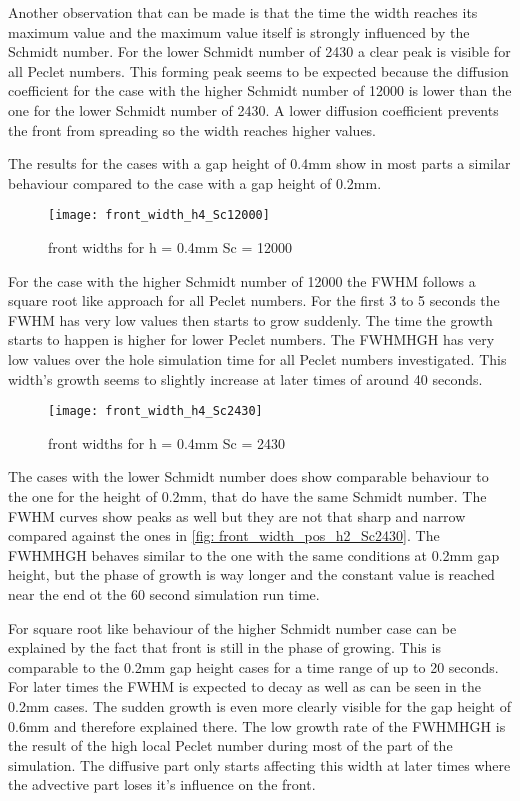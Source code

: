 \documentclass[../thesis.tex]{subfiles}
\begin{document}
Another observation that can be made is that the time the width reaches its maximum value and the maximum value itself is strongly influenced by the Schmidt number. For the lower Schmidt number of 2430 a clear peak is visible for all Peclet numbers. This forming peak seems to be expected because the diffusion coefficient for the case with the higher Schmidt number of 12000 is lower than the one for the lower Schmidt number of 2430. A lower diffusion coefficient prevents the front from spreading so the width reaches higher values.
\newline

The results for the cases with a gap height of 0.4mm show in most parts a similar behaviour compared to the case with a gap height of 0.2mm.
\begin{figure}[htb]
	\centering
	\texttt{[image: front\_width\_h4\_Sc12000]}
	\caption{front widths for  h = 0.4mm Sc = 12000
	\label{fig: front_width_h4_Sc12000}}
\end{figure}
For the case with the higher Schmidt number of 12000 the FWHM follows a square root like approach for all Peclet numbers. For the first 3 to 5 seconds the FWHM has very low values then starts to grow suddenly. The time the growth starts to happen is higher for lower Peclet numbers. The FWHMHGH has very low values over the hole simulation time for all Peclet numbers investigated. This width's growth seems to slightly increase at later times of around 40 seconds.
\begin{figure}[htb]
	\centering
	\texttt{[image: front\_width\_h4\_Sc2430]}
	\caption{front widths for  h = 0.4mm Sc = 2430
		\label{fig: front_width_pos_h4_Sc2430}}
\end{figure}

The cases with the lower Schmidt number does show comparable behaviour to the one for the height of 0.2mm, that do have the same Schmidt number. The FWHM curves show peaks as well but they are not that sharp and narrow compared against the ones in \autoref{fig: front_width_pos_h2_Sc2430}. The FWHMHGH behaves similar to the one with the same conditions at 0.2mm gap height, but the phase of growth is way longer and the constant value is reached near the end ot the 60 second simulation run time.

For square root like behaviour of the higher Schmidt number case can be explained by the fact that front is still in the phase of growing. This is comparable to the 0.2mm gap height cases for a time range of up to 20 seconds. For later times the FWHM is expected to decay as well as can be seen in the 0.2mm cases. The sudden growth is even more clearly visible for the gap height of 0.6mm and therefore explained there. The low growth rate of the FWHMHGH is the result of the high local Peclet number during most of the part of the simulation. The diffusive part only starts affecting this width at later times where the advective part loses it's influence on the front.
\end{document}
